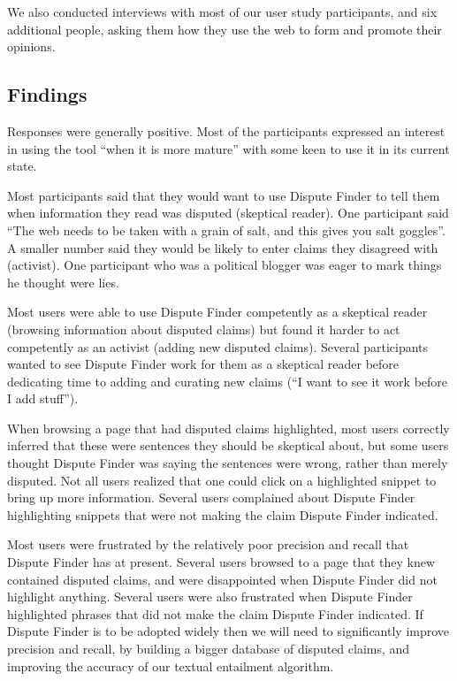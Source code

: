 \documentclass{www2010-accepted}
\newcommand{\todo}[1]{}
\begin{document}
We also conducted interviews with most of our user study participants, and six additional people, asking them how they use the web to form and promote their opinions.

\todo{Need to finish the third wave of user studies}

\subsection{Findings}

Responses were generally positive. Most of the participants expressed an interest in using the tool ``when it is more mature'' with some keen to use it in its current state.

\todo{Tye: say how many were keen to use the tool.}

Most participants said that they would want to use Dispute Finder to tell them when information they read was disputed (skeptical reader). One participant said ``The web needs to be taken with a grain of salt, and this gives you salt goggles''. A smaller number said they would be likely to enter claims they disagreed with (activist). One participant who was a political blogger was eager to mark things he thought were lies.

Most users were able to use Dispute Finder competently as a skeptical reader (browsing information about disputed claims) but found it harder to act competently as an activist (adding new disputed claims). Several participants wanted to see Dispute Finder work for them as a skeptical reader before dedicating time to adding and curating new claims (``I want to see it work before I add stuff'').

When browsing a page that had disputed claims highlighted, most users correctly inferred that these were sentences they should be skeptical about, but some users thought Dispute Finder was saying the sentences were wrong, rather than merely disputed. Not all users realized that one could click on a highlighted snippet to bring up more information. Several users complained about Dispute Finder highlighting snippets that were not making the claim Dispute Finder indicated.

Most users were frustrated by the relatively poor precision and recall that Dispute Finder has at present. Several users browsed to a page that they knew contained disputed claims, and were disappointed when Dispute Finder did not highlight anything. Several users were also frustrated when Dispute Finder highlighted phrases that did not make the claim Dispute Finder indicated. If Dispute Finder is to be adopted widely then we will need to significantly improve precision and recall, by building a bigger database of disputed claims, and improving the accuracy of our textual entailment algorithm.
\end{document}
